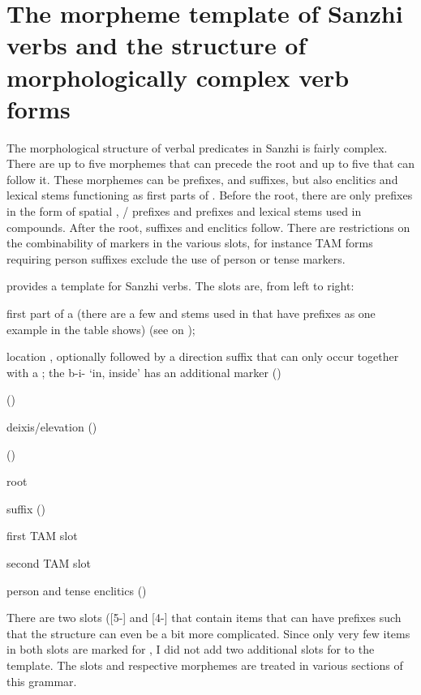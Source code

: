 
\section[The morpheme template of Sanzhi verbs]{The morpheme template of Sanzhi verbs and the structure of morphologically complex verb forms}
\label{sec:The morpheme template of Sanzhi verbs and the structure of morphologically complex verb forms}

The morphological structure of verbal predicates in Sanzhi is fairly complex. There are up to five morphemes that can precede the root and up to five that can follow it. These morphemes can be prefixes, and suffixes, but also enclitics and lexical stems functioning as first parts of . Before the root, there are only prefixes in the form of spatial , / prefixes and  prefixes and lexical stems used in compounds. After the root, suffixes and enclitics follow. There are restrictions on the combinability of markers in the various slots, for instance TAM forms requiring person suffixes exclude the use of  person or tense markers.

 provides a template for Sanzhi verbs. The slots are, from left to right:
%
\begin{description}[leftmargin=*]
	\item[5-]	first part of a  (there are a few  and stems used in  that have  prefixes as one example in the table shows) (see  on ); 
	\item[4-]	location , optionally followed by a direction suffix that can only occur together with a ; the  b-i- `in, inside' has an additional  marker ()
	\item[3-]	 ()
	\item[2-]	deixis/elevation  ()
	\item[1-]	  ()
	\item[0]	root
	\item[-1]	 suffix ()
	\item[-2]	first TAM slot 
	\item[-3]	second TAM slot 
	\item[-4]	person and tense enclitics ()
\end{description}
%
There are two slots ([5-] and [4-] that contain items that can have  prefixes such that the structure can even be a bit more complicated. Since only very few items in both slots are marked for , I did not add two additional slots for  to the template. The slots and respective morphemes are treated in various sections of this grammar.
%

